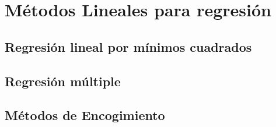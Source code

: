 \section{Métodos Lineales para regresión}
\subsection{Regresión lineal por mínimos cuadrados}
\subsection{Regresión múltiple}
\subsection{Métodos de Encogimiento}